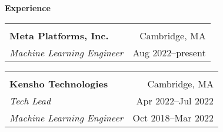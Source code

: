\documentclass[letterpaper,11pt,oneside]{article}
\begin{document}
 \vspace{-0.35cm}
 \raggedright
 \textbf{\Large{Experience}} \sout{\hfill} \\
 \normalsize  
\begin{flushleft}
 \vspace{-0.45cm}
 \begin{tabular}{@{} l r@{} }
    \hspace{0.78\linewidth} & \hspace{0.2\linewidth} \\
    \textbf{Meta Platforms, Inc.} & Cambridge, MA \\ 
    \textit{Machine Learning Engineer} & Aug 2022--present \\ 
 \end{tabular}
 \end{flushleft}
\begin{flushleft}
 \vspace{-0.45cm}
 \begin{tabular}{@{} l r@{} }
    \hspace{0.78\linewidth} & \hspace{0.2\linewidth} \\
    \textbf{Kensho Technologies} & Cambridge, MA \\ 
    \textit{Tech Lead} & Apr 2022--Jul 2022 \\ 
    \textit{Machine Learning Engineer} & Oct 2018--Mar 2022 \\ 
 \end{tabular}
 \end{flushleft}
\end{document}
